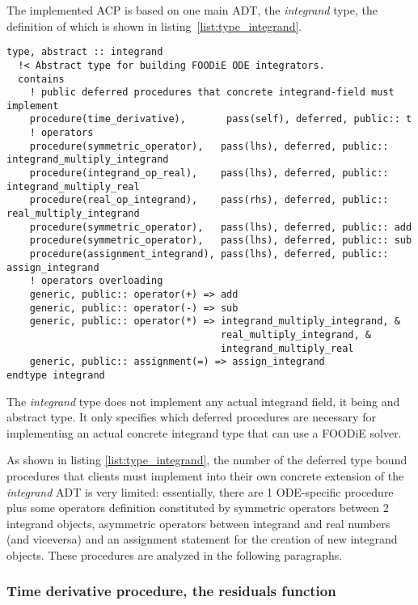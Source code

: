 \documentclass[pdftex,preprint,3p,times,numbers]{elsarticle}
\begin{document}
The implemented ACP is based on one main ADT, the \emph{integrand} type, the definition of which is shown in listing~\ref{list:type_integrand}.

\begin{lstlisting}[firstnumber=1,style=code,caption={integrand type definition},label={list:type_integrand}]
type, abstract :: integrand
  !< Abstract type for building FOODiE ODE integrators.
  contains
    ! public deferred procedures that concrete integrand-field must implement
    procedure(time_derivative),       pass(self), deferred, public:: t
    ! operators
    procedure(symmetric_operator),   pass(lhs), deferred, public:: integrand_multiply_integrand
    procedure(integrand_op_real),    pass(lhs), deferred, public:: integrand_multiply_real
    procedure(real_op_integrand),    pass(rhs), deferred, public:: real_multiply_integrand
    procedure(symmetric_operator),   pass(lhs), deferred, public:: add
    procedure(symmetric_operator),   pass(lhs), deferred, public:: sub
    procedure(assignment_integrand), pass(lhs), deferred, public:: assign_integrand
    ! operators overloading
    generic, public:: operator(+) => add
    generic, public:: operator(-) => sub
    generic, public:: operator(*) => integrand_multiply_integrand, &
                                     real_multiply_integrand, &
                                     integrand_multiply_real
    generic, public:: assignment(=) => assign_integrand
endtype integrand
\end{lstlisting}

The \emph{integrand} type does not implement any actual integrand field, it being and abstract type. It only specifies which deferred procedures are necessary for implementing an actual concrete integrand type that can use a FOODiE solver.

As shown in listing \ref{list:type_integrand}, the number of the deferred type bound procedures that clients must implement into their own concrete extension of the \emph{integrand} ADT is very limited: essentially, there are 1 ODE-specific procedure plus some operators definition constituted by symmetric operators between 2 integrand objects, asymmetric operators between integrand and real numbers (and viceversa) and an assignment statement for the creation of new integrand objects. These procedures are analyzed in the following paragraphs.

\subsubsection{Time derivative procedure, the residuals function}
\end{document}
